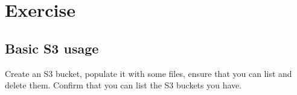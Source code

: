 \section{Exercise}\label{exercise}

\subsection{Basic S3 usage}\label{basic-s3-usage}

Create an S3 bucket, populate it with some files, ensure that you can
list and delete them. Confirm that you can list the S3 buckets you have.







